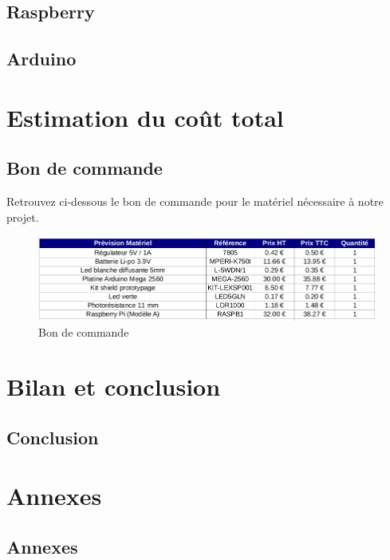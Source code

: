 \documentclass[12pt,titlepage,a4paper]{report}
\begin{document}
		\chapter{Raspberry}
		

		\chapter{Arduino}
		


	\part{Estimation du coût total}
		\chapter{Bon de commande}
		Retrouvez ci-dessous le bon de commande pour le matériel nécessaire à notre 	projet.
		\begin{figure}[H]
			\centering
			\includegraphics[width=550px]{images/lextronic.png}
			\caption{Bon de commande}
		\end{figure}


	\part{Bilan et conclusion}
		\chapter{Conclusion}
		


	\part{Annexes}
		\chapter{Annexes}
		
\end{document}

